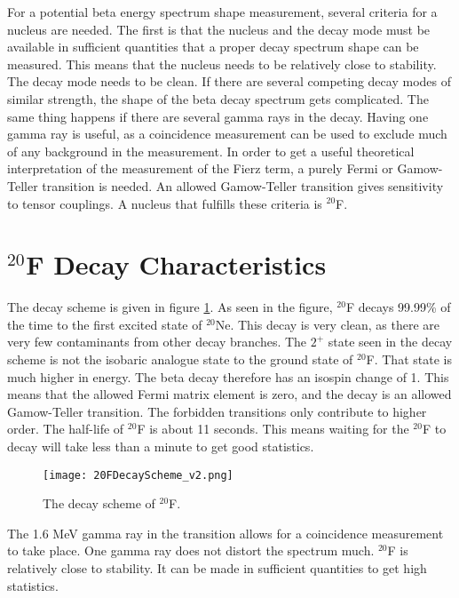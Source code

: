 \documentclass[../MaxHughesThesis.tex]{subfiles}
\begin{document}
For a potential beta energy spectrum shape measurement, several criteria for a nucleus are needed.
The first is that the nucleus and the decay mode must be available in sufficient quantities that a proper decay spectrum shape can be measured.
This means that the nucleus needs to be relatively close to stability.
The decay mode needs to be clean.
If there are several competing decay modes of similar strength, the shape of the beta decay spectrum gets complicated.
The same thing happens if there are several gamma rays in the decay. 
Having one gamma ray is useful, as a coincidence measurement can be used to exclude much of any background in the measurement.
In order to get a useful theoretical interpretation of the measurement of the Fierz term, a purely Fermi or Gamow-Teller transition is needed.
An allowed Gamow-Teller transition gives sensitivity to tensor couplings. 
A nucleus that fulfills these criteria is $^{20}$F. 
 
\section{$^{20}$F Decay Characteristics}

The decay scheme is given in figure \ref{fig:DecayScheme}.
As seen in the figure, $^{20}$F decays 99.99\% of the time to the first excited state of $^{20}$Ne.
This decay is very clean, as there are very few contaminants from other decay branches. 
The $2^{+}$ state seen in the decay scheme is not the isobaric analogue state to the ground state of $^{20}$F.
That state is much higher in energy.
The beta decay therefore has an isospin change of 1.
This means that the allowed Fermi matrix element is zero, and the decay is an allowed Gamow-Teller transition. 
The forbidden transitions only contribute to higher order.
The half-life of $^{20}$F is about 11 seconds. 
This means waiting for the $^{20}$F to decay will take less than a minute to get good statistics.

\begin{figure}[!htb]
	\centerline{\texttt{[image: 20FDecayScheme\_v2.png]}}
	\caption{The decay scheme of $^{20}$F.}
	\label{fig:DecayScheme}
\end{figure}

The 1.6 MeV gamma ray in the transition allows for a coincidence measurement to take place.
One gamma ray does not distort the spectrum much. 
$^{20}$F is relatively close to stability. 
It can be made in sufficient quantities to get high statistics.
\end{document}

